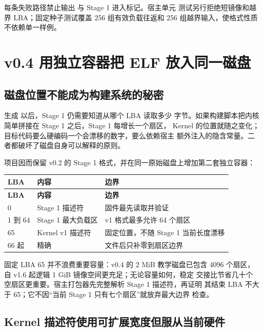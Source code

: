 每条失败路径禁止输出  与 Stage 1 进入标记。宿主单元
测试另行拒绝短镜像和越界 LBA；固定种子测试覆盖 256 组有效负载往返和 256
组越界输入，使格式性质不依赖单一样例。

\section{v0.4 用独立容器把 ELF 放入同一磁盘}

\subsection{磁盘位置不能成为构建系统的秘密}

生成  以后，Stage 1 仍需要知道从哪个 LBA 读取多少
字节。如果构建脚本把内核简单拼接在 Stage 1 之后，Stage 1 每增长一个扇区，
Kernel 的位置就随之变化；目标代码要么硬编码一个会漂移的数字，要么依赖宿主
额外注入的隐含常量。二者都破坏了磁盘自身可以解释的原则。

项目因而保留 v0.2 的 Stage 1 格式，并在同一原始磁盘上增加第二套独立容器：

\begin{longtable}{L{0.16\textwidth}L{0.29\textwidth}L{0.43\textwidth}}
\toprule
\textbf{LBA} & \textbf{内容} & \textbf{边界}\\
\midrule
\endfirsthead
\toprule
\textbf{LBA} & \textbf{内容} & \textbf{边界}\\
\midrule
{} & Stage 1 描述符 & 固件最先读取并验证\\
1 到 64 & Stage 1 最大负载区 & v1 格式最多允许 64 个扇区\\
65 & Kernel v1 描述符 & 固定位置，不随 Stage 1 当前长度漂移\\
66 起 & 精确  & 文件后只补零到扇区边界\\
\bottomrule
\end{longtable}

固定 LBA 65 并不浪费重要容量：v0.4 的 2 MiB 教学磁盘已包含 4096 个扇区，
自 v1.6 起逻辑 1 GiB 镜像空间更充足；无论容量如何，稳定
交接比节省几十个空扇区更重要。宿主打包器先完整解析 Stage 1 描述符，再证明
其结束 LBA 不大于 65；它不因“当前 Stage 1 只有七个扇区”就放弃最大边界
检查。

\subsection{Kernel 描述符使用可扩展宽度但服从当前硬件}

